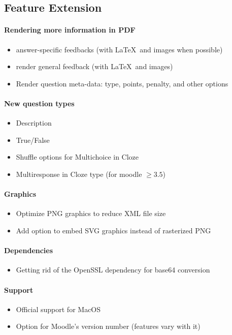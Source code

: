 \documentclass[twocolumn,a4paper,9pt]{article}
\begin{document}
\subsection{Feature Extension}

\paragraph{Rendering more information in PDF}
\begin{itemize}
	\item answer-specific feedbacks (with \LaTeX\ and images when possible)
	\item render general feedback (with \LaTeX\ and images)
	\item Render question meta-data: type, points, penalty, and other options
\end{itemize}

\paragraph{New question types}
\begin{itemize}
	\item Description
	\item True/False
	\item Shuffle options for Multichoice in Cloze
	\item Multiresponse in Cloze type (for moodle $\geq 3.5$)
\end{itemize}

\paragraph{Graphics}
\begin{itemize}
	\item Optimize PNG graphics to reduce XML file size
	\item Add option to embed SVG graphics instead of rasterized PNG
\end{itemize}

\paragraph{Dependencies}
\begin{itemize}
	\item Getting rid of the OpenSSL dependency for base64 conversion
\end{itemize}

\paragraph{Support}
\begin{itemize}
	\item Official support for MacOS
	\item Option for Moodle's version number (features vary with it)
\end{itemize}
\end{document}
